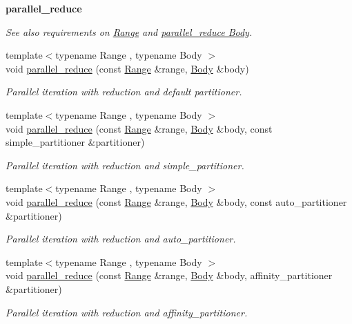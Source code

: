 \begin{Indent}{\bf parallel\+\_\+reduce}\par
{\em See also requirements on \hyperlink{range_req}{Range} and \hyperlink{parallel_reduce_body_req}{parallel\+\_\+reduce Body}. }\begin{DoxyCompactItemize}
\item 
{\footnotesize template$<$typename Range , typename Body $>$ }\\void \hyperlink{group__algorithms_ga7b1ce9568e0a0efe1bd2d55677bc6687}{parallel\+\_\+reduce} (const \hyperlink{classtbb_1_1blocked__range}{Range} \&range, \hyperlink{classBody}{Body} \&body)
\begin{DoxyCompactList}\small\item\em Parallel iteration with reduction and default partitioner. \end{DoxyCompactList}\item 
{\footnotesize template$<$typename Range , typename Body $>$ }\\void \hyperlink{group__algorithms_gaebb92b593827f9c3f5e1f8ee2f7d5f82}{parallel\+\_\+reduce} (const \hyperlink{classtbb_1_1blocked__range}{Range} \&range, \hyperlink{classBody}{Body} \&body, const simple\+\_\+partitioner \&partitioner)
\begin{DoxyCompactList}\small\item\em Parallel iteration with reduction and simple\+\_\+partitioner. \end{DoxyCompactList}\item 
{\footnotesize template$<$typename Range , typename Body $>$ }\\void \hyperlink{group__algorithms_ga3011e7266fb1e43d307060fe75be2c6e}{parallel\+\_\+reduce} (const \hyperlink{classtbb_1_1blocked__range}{Range} \&range, \hyperlink{classBody}{Body} \&body, const auto\+\_\+partitioner \&partitioner)
\begin{DoxyCompactList}\small\item\em Parallel iteration with reduction and auto\+\_\+partitioner. \end{DoxyCompactList}\item 
{\footnotesize template$<$typename Range , typename Body $>$ }\\void \hyperlink{group__algorithms_ga6e83e121490df24fa5893b14e68f5e2a}{parallel\+\_\+reduce} (const \hyperlink{classtbb_1_1blocked__range}{Range} \&range, \hyperlink{classBody}{Body} \&body, affinity\+\_\+partitioner \&partitioner)
\begin{DoxyCompactList}\small\item\em Parallel iteration with reduction and affinity\+\_\+partitioner. \end{DoxyCompactList}\item 

\end{DoxyCompactItemize}
\end{Indent}
